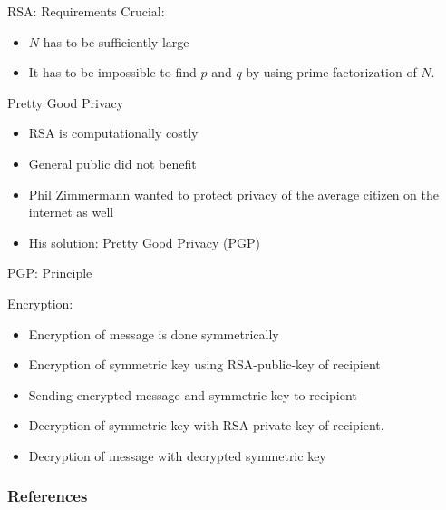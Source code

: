 \documentclass[]{beamer}
\begin{document}
\begin{frame}{RSA: Requirements}
	Crucial: 
	\begin{itemize}
		\item<1-> \(N\) has to be sufficiently large
		\item<2-> It has to be impossible to find \(p\) and \(q\) by using prime factorization of \(N\).
	\end{itemize}
\end{frame}

\begin{frame}{Pretty Good Privacy}
		\begin{itemize}
			\item<1->RSA is computationally costly
			\item<2->General public did not benefit 
			\item<3->Phil Zimmermann wanted to protect privacy of the average citizen on the internet as well
			\item<4->His solution: Pretty Good Privacy (PGP)
		\end{itemize}
\end{frame}

\begin{frame}{PGP: Principle}
	\begin{minipage}[T][5cm][t]{0.45\textwidth}
		Encryption:
		\begin{itemize}
			\item<1->Encryption of message is done symmetrically
			\item<2->Encryption of symmetric key using RSA-public-key of recipient
			\item<3->Sending encrypted message and symmetric key to recipient
		\end{itemize}
	\end{minipage}
	\hfill
	\begin{minipage}[T][5cm][t]{0.45\textwidth}
		\begin{itemize}
			\item<4->Decryption of symmetric key with RSA-private-key of recipient.
			\item<5->Decryption of message with decrypted symmetric key
		\end{itemize}
	\end{minipage}
\end{frame}

\begin{frame}%
	\frametitle{References}
	
	
\end{frame}
\end{document}
